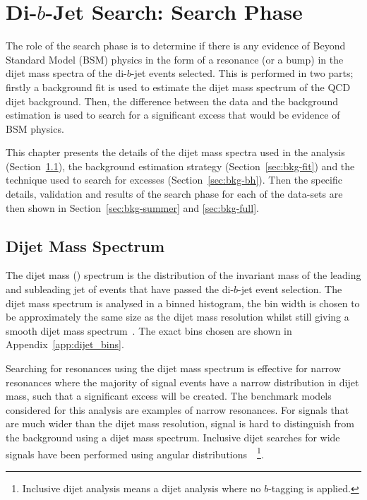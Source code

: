 \chapter{Di-$b$-Jet Search: Search Phase}
\label{sec:bkg}

\vspace{-0.5em}
The role of the search phase is to determine if there is any evidence of Beyond Standard Model (BSM)
physics in the form of a resonance (or a bump) in the dijet mass spectra of the di-$b$-jet events selected.
This is performed in two parts; firstly a background fit is used to estimate
the dijet mass spectrum of the QCD dijet background.
Then, the difference between the data and the background estimation is used 
to search for a significant excess that would be evidence of BSM physics.

This chapter presents
the details of the dijet mass  spectra used in the analysis (Section~\ref{sec:bkg-mjj}),
the background estimation strategy (Section~\ref{sec:bkg-fit}) and
the technique used to search for excesses (Section~\ref{sec:bkg-bh}).
Then the specific details, validation and results of the search phase for each of the data-sets are
then shown in Section~\ref{sec:bkg-summer} and \ref{sec:bkg-full}.

\section{Dijet Mass Spectrum}
\label{sec:bkg-mjj}

The dijet mass (\mjj) spectrum
is the distribution of the invariant mass of the leading and subleading jet
of events that have passed the di-$b$-jet event selection.
The dijet mass spectrum is analysed in a binned histogram,
the bin width is chosen to be approximately the same size as the dijet mass resolution
whilst still giving a smooth dijet mass spectrum~\cite{dijet-mori16_paper}.
The exact bins chosen are shown in Appendix~\ref{app:dijet_bins}.

Searching for resonances using the dijet mass spectrum is effective
for narrow resonances where the majority of signal events have a narrow distribution in dijet mass,
such that a significant excess will be created.
The benchmark models considered for this analysis are examples of narrow resonances.
For signals that are much wider than the dijet mass resolution,
signal is hard to distinguish from the background using a dijet mass spectrum.
Inclusive dijet searches for wide signals have been performed using angular distributions~\cite{dijet-mori16_paper}~\footnote{Inclusive
  dijet analysis means a dijet analysis where no $b$-tagging is applied.}.

